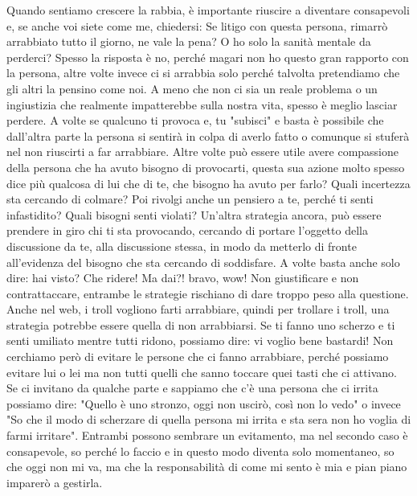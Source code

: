\documentclass[12pt]{book} %
\begin{document}
Quando sentiamo crescere la rabbia, è importante riuscire a diventare consapevoli e, se anche voi siete come me, chiedersi:
Se litigo con questa persona, rimarrò arrabbiato tutto il giorno, ne vale la pena? O ho solo la sanità mentale da perderci?
Spesso la risposta è no, perché magari non ho questo gran rapporto con la persona, altre volte invece ci si arrabbia solo perché talvolta pretendiamo che gli altri la pensino come noi. A meno che non ci sia un reale problema o un ingiustizia che realmente impatterebbe sulla nostra vita, spesso è meglio lasciar perdere. 
A volte se qualcuno ti provoca e, tu "subisci" e basta è possibile che dall'altra parte la persona si sentirà in colpa di averlo fatto o comunque si stuferà nel non riuscirti a far arrabbiare. Altre volte può essere utile avere compassione della persona che ha avuto bisogno di provocarti, questa sua azione molto spesso dice più qualcosa di lui che di te, che bisogno ha avuto per farlo? Quali incertezza sta cercando di colmare? Poi rivolgi anche un pensiero a te, perché ti senti infastidito? Quali bisogni senti violati?
Un'altra strategia ancora, può essere prendere in giro chi ti sta provocando, cercando di portare l'oggetto della discussione da te, alla discussione stessa, in modo da metterlo di fronte all'evidenza del bisogno che sta cercando di soddisfare. A volte basta anche solo dire: \newline
hai visto? Che ridere! \newline
Ma dai?! bravo, wow! \newline
Non giustificare e non contrattaccare, entrambe le strategie rischiano di dare troppo peso alla questione.
Anche nel web, i troll vogliono farti arrabbiare, quindi per trollare i troll, una strategia potrebbe essere quella di non arrabbiarsi.
Se ti fanno uno scherzo e ti senti umiliato mentre tutti ridono, possiamo dire: vi voglio bene bastardi!
Non cerchiamo però di evitare le persone che ci fanno arrabbiare, perché possiamo evitare lui o lei ma non tutti quelli che sanno toccare quei tasti che ci attivano. Se ci invitano da qualche parte e sappiamo che c'è una persona che ci irrita possiamo dire: "Quello è uno stronzo, oggi non uscirò, così non lo vedo" o invece "So che il modo di scherzare di quella persona mi irrita e sta sera non ho voglia di farmi irritare". Entrambi possono sembrare un evitamento, ma nel secondo caso è consapevole, so perché lo faccio e in questo modo diventa solo momentaneo, so che oggi non mi va, ma che la responsabilità di come mi sento è mia e pian piano imparerò a gestirla.
\end{document}
